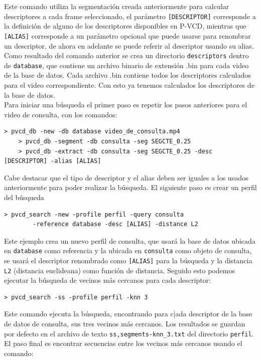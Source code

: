 Este comando utiliza la segmentación creada anteriormente para calcular descriptores a cada frame seleccionado, el parámetro \texttt{[DESCRIPTOR]} corresponde a la definición de alguno de los descriptores disponibles en P-VCD, mientras que \texttt{[ALIAS]} corresponde a un parámetro opcional que puede usarse para renombrar un descriptor, de ahora en adelante se puede referir al descriptor usando su alias. Como resultado del comando anterior se crea un directorio \texttt{descriptors} dentro de \texttt{database}, que contiene un archivo binario de extensión .bin para cada video de la base de datos. Cada archivo .bin contiene todos los descriptores calculados para el video correspondiente. Con esto ya tenemos calculados los descriptores de la base de datos.\\

Para iniciar una búsqueda el primer paso es repetir los pasos anteriores para el video de consulta, con los comandos:
\begin{lstlisting}[style=BashInputStyle]
    > pvcd_db -new -db database video_de_consulta.mp4
    > pvcd_db -segment -db consulta -seg SEGCTE_0.25
    > pvcd_db -extract -db consulta -seg SEGCTE_0.25 -desc [DESCRIPTOR] -alias [ALIAS]
\end{lstlisting}
Cabe destacar que el tipo de descriptor y el alias deben ser iguales a los usados anteriormente para poder realizar la búsqueda. El siguiente paso es crear un perfil del búsqueda
\begin{lstlisting}[style=BashInputStyle]
    > pvcd_search -new -profile perfil -query consulta
        -reference database -desc [ALIAS] -distance L2
\end{lstlisting}
Este ejemplo crea un nuevo perfil de consulta, que usará la base de datos ubicada en \texttt{database} como referencia y la ubicada en \texttt{consulta} como objeto de consulta, se usará el descriptor renombrado como \texttt{[ALIAS]} para la búsqueda y la distancia \texttt{L2} (distancia euclideana) como función de distancia. Seguido esto podemos ejecutar la búsqueda de vecinos más cercanos para cada descriptor:
\begin{lstlisting}[style=BashInputStyle]
    > pvcd_search -ss -profile perfil -knn 3
\end{lstlisting}
Este comando ejecuta la búsqueda, encontrando para c|ada descriptor de la base de datos de consulta, sus tres vecinos más cercanos. Los resultados se guardan por defecto en el archivo de texto \texttt{ss,segments-knn\_3.txt} del directorio \texttt{perfil}. El paso final es encontrar secuencias entre los vecinos más cercanos usando el comando:
